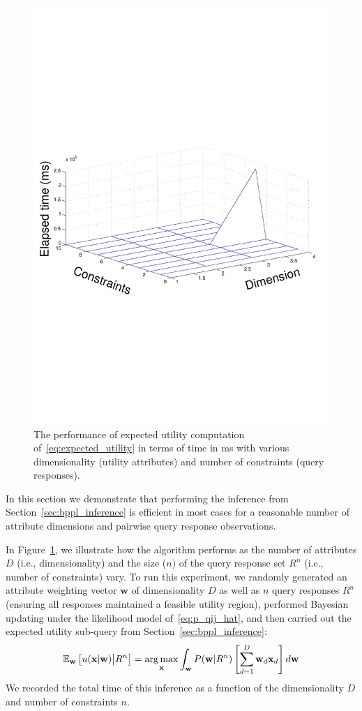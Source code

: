 \documentclass{article} %
\newcommand{\E}{\mathbb{E}}
\renewcommand{\vec}[1]{\mathbf{#1}}
\def\argmax{\operatornamewithlimits{arg\,max}}
\begin{document}
\begin{figure}[t!]
\centering
\vspace{-40mm}
\includegraphics[width=.6\textwidth,clip=true]{dim_constraint_time}
\vspace{-35mm}
\caption{\footnotesize
The performance of expected utility computation of~\eqref{eq:expected_utility} in terms of time in ms with various dimensionality (utility attributes) and number of constraints (query responses).} \label{fig:running_time}
\end{figure}

In this section we demonstrate that performing the inference from
Section~\ref{sec:bppl_inference} is efficient in most cases for
a reasonable number of attribute dimensions and pairwise query
response observations.

In Figure~\ref{fig:running_time}, we illustrate how the algorithm
performs as the number of attributes $D$ (i.e., dimensionality) 
and the size ($n$) of the query response set $R^n$ 
(i.e., number of constraints) vary.
To run this experiment, we randomly generated an attribute weighting
vector $\vec{w}$ of dimensionality $D$ as well as 
$n$ query responses $R^n$
(ensuring all responses maintained a feasible utility region),
performed Bayesian updating under the likelihood model 
of~\eqref{eq:p_qij_hat}, 
and then carried out the expected utility
sub-query from Section~\ref{sec:bppl_inference}:
\begin{align}
\E_{\vec{w}} \left[ u(\vec{x}|\vec{w}) \big| R^n \right] = \argmax_{\vec{x}} \int_{\vec{w}} P(\vec{w}|R^n) \left[ \sum_{d=1}^{D} \vec{w}_d \vec{x}_d \right] d\vec{w} \label{eq:expected_utility}
\end{align}
We recorded the total time of this inference as a function of the
dimensionality $D$ and number of constraints $n$.
\end{document}
